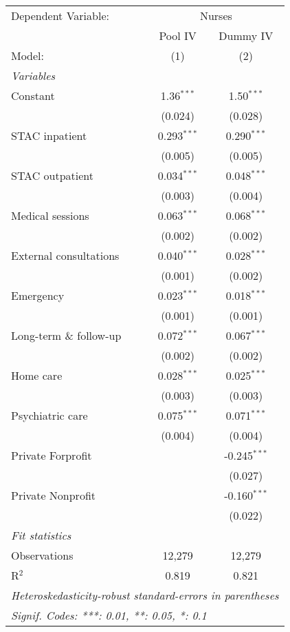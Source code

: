 
\begingroup
\centering
\begin{tabular}{lcc}
   \tabularnewline \midrule \midrule
   Dependent Variable: & \multicolumn{2}{c}{Nurses}\\
                           & Pool IV       & Dummy IV \\   
   Model:                  & (1)           & (2)\\  
   \midrule
   \emph{Variables}\\
   Constant                & 1.36$^{***}$  & 1.50$^{***}$\\   
                           & (0.024)       & (0.028)\\   
   STAC inpatient          & 0.293$^{***}$ & 0.290$^{***}$\\   
                           & (0.005)       & (0.005)\\   
   STAC outpatient         & 0.034$^{***}$ & 0.048$^{***}$\\   
                           & (0.003)       & (0.004)\\   
   Medical sessions        & 0.063$^{***}$ & 0.068$^{***}$\\   
                           & (0.002)       & (0.002)\\   
   External consultations  & 0.040$^{***}$ & 0.028$^{***}$\\   
                           & (0.001)       & (0.002)\\   
   Emergency               & 0.023$^{***}$ & 0.018$^{***}$\\   
                           & (0.001)       & (0.001)\\   
   Long-term \& follow-up  & 0.072$^{***}$ & 0.067$^{***}$\\   
                           & (0.002)       & (0.002)\\   
   Home care               & 0.028$^{***}$ & 0.025$^{***}$\\   
                           & (0.003)       & (0.003)\\   
   Psychiatric care        & 0.075$^{***}$ & 0.071$^{***}$\\   
                           & (0.004)       & (0.004)\\   
   Private Forprofit       &               & -0.245$^{***}$\\   
                           &               & (0.027)\\   
   Private Nonprofit       &               & -0.160$^{***}$\\   
                           &               & (0.022)\\   
   \midrule
   \emph{Fit statistics}\\
   Observations            & 12,279        & 12,279\\  
   R$^2$                   & 0.819         & 0.821\\  
   \midrule \midrule
   \multicolumn{3}{l}{\emph{Heteroskedasticity-robust standard-errors in parentheses}}\\
   \multicolumn{3}{l}{\emph{Signif. Codes: ***: 0.01, **: 0.05, *: 0.1}}\\
\end{tabular}
\par\endgroup


